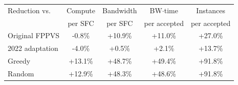\begin{tabular}{lcccc}
\toprule
Reduction vs. & Compute & Bandwidth & BW$\cdot$time & Instances \\
 & per SFC & per SFC & per accepted & per accepted \\
\midrule
Original FPPVS & -0.8\% & +10.9\% & +11.0\% & +27.0\% \\
2022 adaptation & -4.0\% & +0.5\% & +2.1\% & +13.7\% \\
Greedy & +13.1\% & +48.7\% & +49.4\% & +91.8\% \\
Random & +12.9\% & +48.3\% & +48.6\% & +91.8\% \\
\bottomrule
\end{tabular}